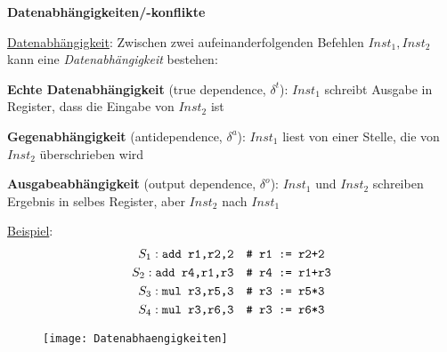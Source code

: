 \textbf{Datenabhängigkeiten/-konflikte}
\begin{items}
  \item \underline{Datenabhängigkeit}: Zwischen zwei aufeinanderfolgenden Befehlen \( Inst_1, Inst_2 \) kann eine \emph{Datenabhängigkeit} bestehen:
  \begin{enumeration}
    \item \textbf{Echte Datenabhängigkeit} (true dependence, \( \delta^t \)): \( Inst_1 \) schreibt Ausgabe in Register, dass die Eingabe von \( Inst_2 \) ist
    \item \textbf{Gegenabhängigkeit} (antidependence, \( \delta^a \)): \( Inst_1 \) liest von einer Stelle, die von \( Inst_2 \) überschrieben wird
    \item \textbf{Ausgabeabhängigkeit} (output dependence, \( \delta^o \)): \( Inst_1 \) und \( Inst_2 \) schreiben Ergebnis in selbes Register, aber \( Inst_2 \) nach \( Inst_1 \)
  \end{enumeration}

  \item \underline{Beispiel}:
  \begin{align*}
    S_1: \text{\code{add r1,r2,2}} &\quad \text{\code{# r1 := r2+2}} \\
    S_2: \text{\code{add r4,r1,r3}} &\quad \text{\code{# r4 := r1+r3}} \\
    S_3: \text{\code{mul r3,r5,3}} &\quad \text{\code{# r3 := r5*3}} \\
    S_4: \text{\code{mul r3,r6,3}} &\quad \text{\code{# r3 := r6*3}}
  \end{align*}
  \begin{figure}[H]\centering\label{Datenabhaengigkeiten}\texttt{[image: Datenabhaengigkeiten]}\end{figure}


\end{items}
